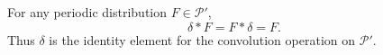 For any periodic distribution $F \in \mathcal{P}'$,
$$\delta * F = F * \delta = F.$$
Thus $\delta$ is the identity element for the convolution operation on $\mathcal{P}'$.
